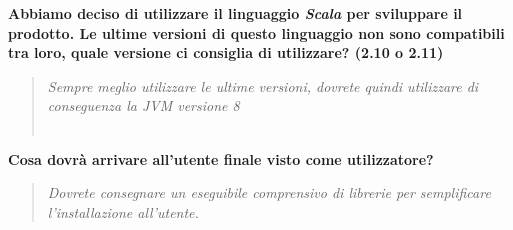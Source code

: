 \documentclass{scalatekids-article}
\begin{document}
\textbf{Abbiamo deciso di utilizzare il linguaggio \textit{Scala} per sviluppare il prodotto. Le ultime versioni di questo linguaggio non sono compatibili tra loro, quale versione ci consiglia di utilizzare? (2.10 o 2.11)}
\begin{quote}
  \textit{Sempre meglio utilizzare le ultime versioni, dovrete quindi utilizzare di conseguenza la JVM versione 8\\ \\}
\end{quote}
\textbf{Cosa dovrà arrivare all'utente finale visto come utilizzatore?}
\begin{quote}
  \textit{Dovrete consegnare un eseguibile comprensivo di librerie  per semplificare l'installazione all'utente.}
\end{quote}
\end{document}
